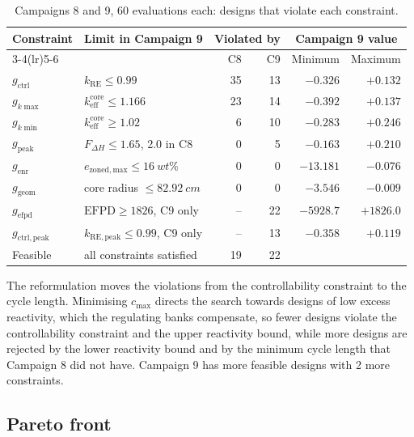 \begin{table}[htbp]
  \centering
    \caption{Campaigns 8 and 9, 60 evaluations each: designs that violate each constraint.}
  \label{tab:c9-constraints}
  \small
  \setlength{\tabcolsep}{4pt}
  \begin{tabular}{@{}llrrrr@{}}
    \toprule
    Constraint & Limit in Campaign 9 & \multicolumn{2}{c}{Violated by} & \multicolumn{2}{c}{Campaign 9 value} \\
    \cmidrule(lr){3-4}\cmidrule(lr){5-6}
     & & C8 & C9 & Minimum & Maximum \\
    \midrule
    $g_\mathrm{ctrl}$      & $k_\mathrm{RE} \le 0.99$ & 35 & 13 & $-0.326$ & $+0.132$ \\
    $g_{k\max}$            & $k_\mathrm{eff}^\mathrm{core} \le 1.166$ & 23 & 14 & $-0.392$ & $+0.137$ \\
    $g_{k\min}$            & $k_\mathrm{eff}^\mathrm{core} \ge 1.02$ & 6 & 10 & $-0.283$ & $+0.246$ \\
    $g_\mathrm{peak}$      & $F_{\Delta H} \le 1.65$, 2.0 in C8 & 0 & 5 & $-0.163$ & $+0.210$ \\
    $g_\mathrm{enr}$       & $e_\mathrm{zoned,max} \le \SI{16}{wt\%}$ & 0 & 0 & $-13.181$ & $-0.076$ \\
    $g_\mathrm{geom}$      & core radius $\le \SI{82.92}{cm}$ & 0 & 0 & $-3.546$ & $-0.009$ \\
    $g_\mathrm{efpd}$      & $\mathrm{EFPD} \ge 1826$, C9 only & -- & 22 & $-5928.7$ & $+1826.0$ \\
    $g_\mathrm{ctrl,peak}$ & $k_\mathrm{RE,peak} \le 0.99$, C9 only & -- & 13 & $-0.358$ & $+0.119$ \\
    \midrule
    Feasible & all constraints satisfied & 19 & 22 & & \\
    \bottomrule
  \end{tabular}
\end{table}

The reformulation moves the violations from the controllability
constraint to the cycle length. Minimising $c_\mathrm{max}$ directs the
search towards designs of low excess reactivity, which the regulating
banks compensate, so fewer designs violate the controllability
constraint and the upper reactivity bound, while more designs are
rejected by the lower reactivity bound and by the minimum cycle length
that Campaign 8 did not have. Campaign 9 has more feasible designs with
2 more constraints.

\subsection{Pareto front}
\label{sec:res-c9-front}

